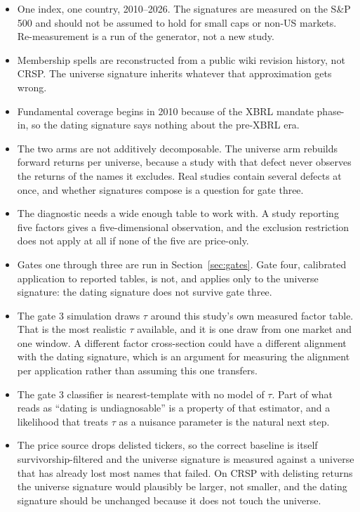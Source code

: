 \documentclass[11pt]{article}
\begin{document}
\begin{itemize}
\item One index, one country, 2010--2026. The signatures are measured on the S\&P 500 and
should not be assumed to hold for small caps or non-US markets. Re-measurement is a run of
the generator, not a new study.
\item Membership spells are reconstructed from a public wiki revision history, not CRSP.
The universe signature inherits whatever that approximation gets wrong.
\item Fundamental coverage begins in 2010 because of the XBRL mandate phase-in, so the
dating signature says nothing about the pre-XBRL era.
\item The two arms are not additively decomposable. The universe arm rebuilds forward
returns per universe, because a study with that defect never observes the returns of the
names it excludes. Real studies contain several defects at once, and whether signatures
compose is a question for gate three.
\item The diagnostic needs a wide enough table to work with. A study reporting five
factors gives a five-dimensional observation, and the exclusion restriction does not apply
at all if none of the five are price-only.
\item Gates one through three are run in Section~\ref{sec:gates}. Gate four,
calibrated application to reported tables, is not, and applies only to the universe
signature: the dating signature does not survive gate three.
\item The gate 3 simulation draws $\tau$ around this study's own measured factor
table. That is the most realistic $\tau$ available, and it is one draw from one
market and one window. A different factor cross-section could have a different
alignment with the dating signature, which is an argument for measuring the
alignment per application rather than assuming this one transfers.
\item The gate 3 classifier is nearest-template with no model of $\tau$. Part of what
reads as ``dating is undiagnosable'' is a property of that estimator, and a likelihood
that treats $\tau$ as a nuisance parameter is the natural next step.
\item The price source drops delisted tickers, so the correct baseline is itself
survivorship-filtered and the universe signature is measured against a universe that has
already lost most names that failed. On CRSP with delisting returns the universe
signature would plausibly be larger, not smaller, and the dating signature should be
unchanged because it does not touch the universe.
\end{itemize}
\end{document}
